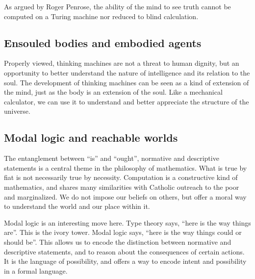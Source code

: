 \documentclass[sigplan,nonacm]{acmart}\settopmatter{printfolios=false,printccs=false,printacmref=false}
\begin{document}
  As argued by Roger Penrose, the ability of the mind to see truth cannot be computed on a Turing machine nor reduced to blind calculation.

  \subsection{Ensouled bodies and embodied agents}

  Properly viewed, thinking machines are not a threat to human dignity, but an opportunity to better understand the nature of intelligence and its relation to the soul. The development of thinking machines can be seen as a kind of extension of the mind, just as the body is an extension of the soul. Like a mechanical calculator, we can use it to understand and better appreciate the structure of the universe.

  \subsection{Modal logic and reachable worlds}

  The entanglement between ``is'' and ``ought'', normative and descriptive statements is a central theme in the philosophy of mathematics. What is true by fiat is not necessarily true by necessity. Computation is a constructive kind of mathematics, and shares many similarities with Catholic outreach to the poor and marginalized. We do not impose our beliefs on others, but offer a moral way to understand the world and our place within it.

  Modal logic is an interesting move here. Type theory says, ``here is the way things are''. This is the ivory tower. Modal logic says, ``here is the way things could or should be''. This allows us to encode the distinction between normative and descriptive statements, and to reason about the consequences of certain actions. It is the language of possibility, and offers a way to encode intent and possibility in a formal language.

  
\end{document}
